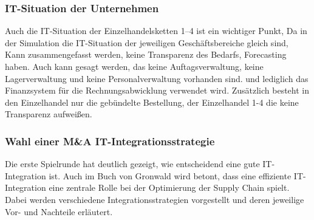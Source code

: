 \documentclass[a4paper,12pt]{article}
\begin{document}
\subsubsection{IT-Situation der Unternehmen}
Auch die IT-Situation der Einzelhandelsketten 1–4 ist ein wichtiger Punkt,
Da in der Simulation die IT-Situation der jeweiligen Geschäftsbereiche gleich sind,
Kann zusammengefasst werden, keine Transparenz des Bedarfs, Forecasting haben.
Auch kann gesagt werden, das keine Auftagsverwaltung, keine Lagerverwaltung und keine Personalverwaltung
vorhanden sind. und lediglich das Finanzsystem für die Rechnungsabwicklung verwendet wird.
Zusätzlich besteht in den Einzelhandel nur die gebündelte Bestellung, der Einzelhandel 1-4 
die keine Transparenz aufweißen.\cite[Kapitel 8.2.4]{Gronwald2020}


\subsubsection{Wahl einer M\&A IT-Integrationsstrategie}
Die erste Spielrunde hat deutlich gezeigt, wie entscheidend eine gute IT-Integration ist.
Auch im Buch von Gronwald wird betont, dass eine effiziente IT-Integration eine zentrale Rolle bei der Optimierung der Supply Chain spielt.
Dabei werden verschiedene Integrationsstrategien vorgestellt und deren jeweilige Vor- und Nachteile erläutert.
\end{document}
